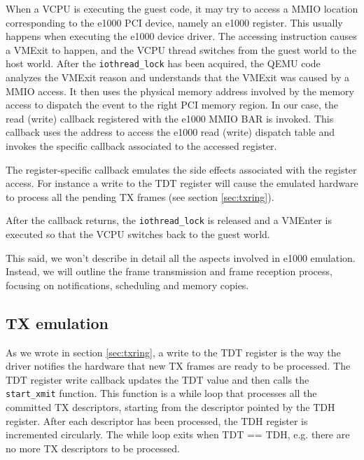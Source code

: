 When a VCPU is executing the guest code, it may try to access a MMIO location corresponding to the e1000 PCI device, namely an e1000
register. This usually happens when executing the e1000 device driver.
The accessing instruction causes a VMExit to happen, and the VCPU thread switches from the guest world to the host world. 
After the \texttt{iothread\_lock} has been acquired, the QEMU code analyzes the VMExit reason and understands that the VMExit was caused
by a MMIO access.
It then uses the physical memory address involved by the memory access to dispatch the event to the right PCI memory region.
In our case, the read (write) callback registered with the e1000 MMIO BAR is invoked. This callback uses the address to access the 
e1000 read (write) dispatch table and invokes the specific callback associated to the accessed register.

The register-specific callback emulates the side effects associated with the register access. For instance a write to the TDT
register will cause the emulated hardware to process all the pending TX frames (see section \ref{sec:txring}).

After the callback returns, the \texttt{iothread\_lock} is released and a VMEnter is executed so that the VCPU switches back to the 
guest world.

\vspace{0.5cm}

This said, we won't describe in detail all the aspects involved in e1000 emulation. Instead, we will outline the frame
transmission and frame reception process, focusing on notifications, scheduling and memory copies.


\subsection{TX emulation}
\label{sec:e1000txemu}
As we wrote in section \ref{sec:txring}, a write to the TDT register is the way the driver notifies the hardware that new TX frames 
are ready to be processed.
The TDT register write callback updates the TDT value and then calls the \texttt{start\_xmit} function. This function is a while
loop that processes all the committed TX descriptors, starting from the descriptor pointed by the TDH register. After each
descriptor has been processed, the TDH register is incremented circularly. The while loop exits when TDT == TDH, e.g. there
are no more TX descriptors to be processed.

